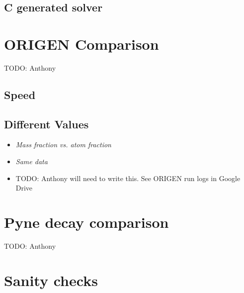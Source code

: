 \documentclass{article}
\makeatletter
\newcommand\todo[1]{{\color{red}TODO\@: #1}}
\makeatother
\begin{document}
\subsection{C generated solver}
\label{sec:c-solve}


\section{ORIGEN Comparison}
\todo{Anthony}
\subsection{Speed}
\label{sec:origen-speed}

\subsection{Different Values}
\begin{itemize}
\item \it{Mass fraction vs. atom fraction}
\item {\it Same data}
\item \todo{Anthony will need to write this. See ORIGEN run logs in Google Drive}
\end{itemize}

\section{Pyne decay comparison}
\todo{Anthony}

\section{Sanity checks}
\label{sec:sanity-checks}


\clearpage

\end{document}
